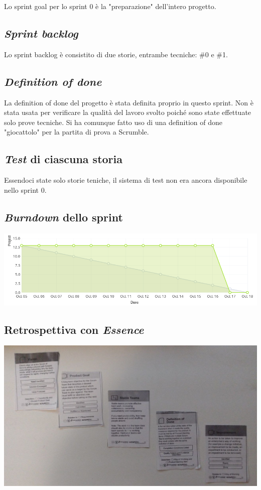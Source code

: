 \documentclass{article}
\begin{document}
Lo sprint goal per lo sprint 0 è la "preparazione" dell'intero progetto.

\subsection{\emph{Sprint backlog}}

Lo sprint backlog è consistito di due storie, entrambe tecniche: \#0 e \#1.

\subsection{\emph{Definition of done}}

La definition of done del progetto è stata definita proprio in questo sprint.
Non è stata usata per verificare la qualità del lavoro svolto poiché sono state
effettuate solo prove tecniche. Si ha comunque fatto uso di una definition of
done "giocattolo" per la partita di prova a Scrumble.

\subsection{\emph{Test} di ciascuna storia}

Essendoci state solo storie teniche, il sistema di test non era ancora
disponibile nello sprint 0.

\subsection{\emph{Burndown} dello sprint}

\includegraphics[width=\textwidth]{burndown-0.png}

\subsection{Retrospettiva con \emph{Essence}}

\includegraphics[width=\textwidth]{essence-0.jpg}
\end{document}
